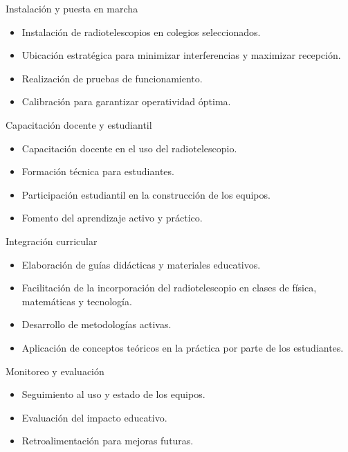 \begin{frame}{Instalación y puesta en marcha}
	\begin{itemize}
    \item Instalación de radiotelescopios en colegios seleccionados.
    \item Ubicación estratégica para minimizar interferencias y maximizar 
		recepción.
    \item Realización de pruebas de funcionamiento.
    \item Calibración para garantizar operatividad óptima.
	\end{itemize}
\end{frame}

\begin{frame}{Capacitación docente y estudiantil}
	\begin{itemize}
    \item Capacitación docente en el uso del radiotelescopio.
    \item Formación técnica para estudiantes.
    \item Participación estudiantil en la construcción de los equipos.
    \item Fomento del aprendizaje activo y práctico.
	\end{itemize}
\end{frame}

\begin{frame}{Integración curricular}
	\begin{itemize}
    \item Elaboración de guías didácticas y materiales educativos.
    \item Facilitación de la incorporación del radiotelescopio en clases de física, matemáticas y tecnología.
    \item Desarrollo de metodologías activas.
    \item Aplicación de conceptos teóricos en la práctica por parte de los estudiantes.
	\end{itemize}
\end{frame}

\begin{frame}{Monitoreo y evaluación}
	\begin{itemize}
    \item Seguimiento al uso y estado de los equipos.
    \item Evaluación del impacto educativo.
    \item Retroalimentación para mejoras futuras.
	\end{itemize}
\end{frame}
